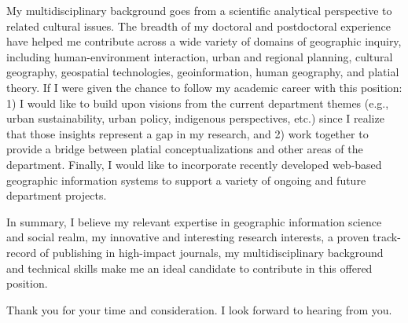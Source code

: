 My multidisciplinary background goes from a scientific analytical perspective to related cultural issues. The breadth of my doctoral and postdoctoral experience have helped me contribute across a wide variety of domains of geographic inquiry, including human-environment interaction, urban and regional planning, cultural geography, geospatial technologies, geoinformation, human geography, and platial theory. If I were given the chance to follow my academic career with this position: 1) I would like to build upon visions from the current department themes (e.g., urban sustainability, urban policy, indigenous perspectives, etc.) since I realize that those insights represent a gap in my research, and 2) work together to provide a bridge between platial conceptualizations and other areas of the department. Finally, I would like to incorporate recently developed web-based geographic information systems to support a variety of ongoing and future department projects.\par

In summary, I believe my relevant expertise in geographic information science and social realm, my innovative and interesting research interests, a proven track-record of publishing in high-impact journals, my multidisciplinary background and technical skills make me an ideal candidate to contribute in this offered position.\par

Thank you for your time and consideration. I look forward to hearing from you.\par
